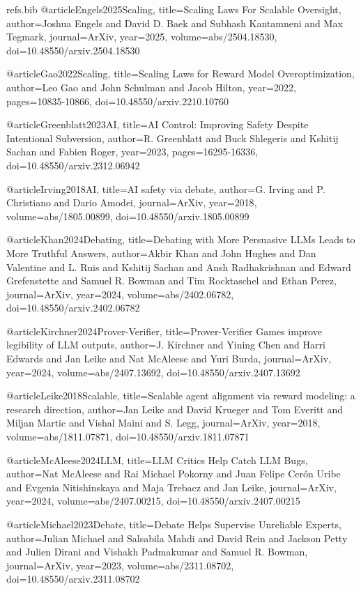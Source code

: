 \begin{filecontents}{refs.bib}
@article{Engels2025Scaling,
title={Scaling Laws For Scalable Oversight},
author={Joshua Engels and David D. Baek and Subhash Kantamneni and Max Tegmark},
journal={ArXiv},
year={2025},
volume={abs/2504.18530},
doi={10.48550/arxiv.2504.18530}
}

@article{Gao2022Scaling,
title={Scaling Laws for Reward Model Overoptimization},
author={Leo Gao and John Schulman and Jacob Hilton},
year={2022},
pages={10835-10866},
doi={10.48550/arxiv.2210.10760}
}

@article{Greenblatt2023AI,
title={AI Control: Improving Safety Despite Intentional Subversion},
author={R. Greenblatt and Buck Shlegeris and Kshitij Sachan and Fabien Roger},
year={2023},
pages={16295-16336},
doi={10.48550/arxiv.2312.06942}
}

@article{Irving2018AI,
title={AI safety via debate},
author={G. Irving and P. Christiano and Dario Amodei},
journal={ArXiv},
year={2018},
volume={abs/1805.00899},
doi={10.48550/arxiv.1805.00899}
}

@article{Khan2024Debating,
title={Debating with More Persuasive LLMs Leads to More Truthful Answers},
author={Akbir Khan and John Hughes and Dan Valentine and L. Ruis and Kshitij Sachan and Ansh Radhakrishnan and Edward Grefenstette and Samuel R. Bowman and Tim Rocktaschel and Ethan Perez},
journal={ArXiv},
year={2024},
volume={abs/2402.06782},
doi={10.48550/arxiv.2402.06782}
}

@article{Kirchner2024Prover-Verifier,
title={Prover-Verifier Games improve legibility of LLM outputs},
author={J. Kirchner and Yining Chen and Harri Edwards and Jan Leike and Nat McAleese and Yuri Burda},
journal={ArXiv},
year={2024},
volume={abs/2407.13692},
doi={10.48550/arxiv.2407.13692}
}

@article{Leike2018Scalable,
title={Scalable agent alignment via reward modeling: a research direction},
author={Jan Leike and David Krueger and Tom Everitt and Miljan Martic and Vishal Maini and S. Legg},
journal={ArXiv},
year={2018},
volume={abs/1811.07871},
doi={10.48550/arxiv.1811.07871}
}

@article{McAleese2024LLM,
title={LLM Critics Help Catch LLM Bugs},
author={Nat McAleese and Rai Michael Pokorny and Juan Felipe Cerón Uribe and Evgenia Nitishinskaya and Maja Trebacz and Jan Leike},
journal={ArXiv},
year={2024},
volume={abs/2407.00215},
doi={10.48550/arxiv.2407.00215}
}

@article{Michael2023Debate,
title={Debate Helps Supervise Unreliable Experts},
author={Julian Michael and Salsabila Mahdi and David Rein and Jackson Petty and Julien Dirani and Vishakh Padmakumar and Samuel R. Bowman},
journal={ArXiv},
year={2023},
volume={abs/2311.08702},
doi={10.48550/arxiv.2311.08702}
}


\end{filecontents}
